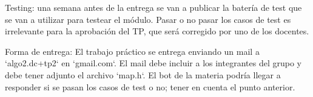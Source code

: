 \begin{DoxyItemize}
\item \-Testing\-: una semana antes de la entrega se van a publicar la batería de test que se van a utilizar para testear el módulo. \-Pasar o no pasar los casos de test es irrelevante para la aprobación del \-T\-P, que será corregido por uno de los docentes.
\item \-Forma de entrega\-: \-El trabajo práctico se entrega enviando un mail a `algo2.dc+tp2` en `gmail.com`. \-El mail debe incluir a los integrantes del grupo y debe tener adjunto el archivo `map.h`. \-El bot de la materia podría llegar a responder si se pasan los casos de test o no; tener en cuenta el punto anterior. 
\end{DoxyItemize}